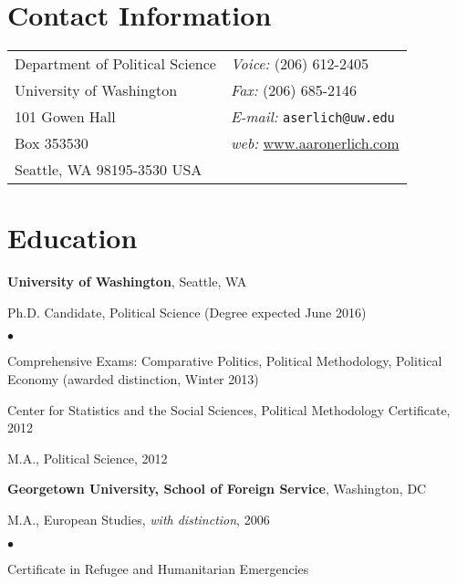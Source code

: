 \documentclass[margin,line]{res}
\newenvironment{list1}{
  \begin{list}{\ding{113}}{%
      \setlength{\itemsep}{0in}
      \setlength{\parsep}{0in} \setlength{\parskip}{0in}
      \setlength{\topsep}{0in} \setlength{\partopsep}{0in} 
      \setlength{\leftmargin}{0.17in}}}{\end{list}}
\newenvironment{list2}{
  \begin{list}{$\bullet$}{%
      \setlength{\itemsep}{0in}
      \setlength{\parsep}{0in} \setlength{\parskip}{0in}
      \setlength{\topsep}{0in} \setlength{\partopsep}{0in} 
      \setlength{\leftmargin}{0.2in}}}{\end{list}}
\begin{document}
{\name{\textcolor{Maroon}{\LARGE	Aaron S. Erlich} \vspace*{.1in}}

\begin{resume}
\section{\sc Contact Information}
\vspace{.05in}
\begin{tabular}{@{}p{2in}p{4in}}
Department of Political Science        &    {\it Voice:}  (206) 612-2405 \\            
University of Washington   &    {\it Fax:}    (206) 685-2146\\         
101 Gowen Hall   & {\it E-mail:} \texttt{aserlich@uw.edu}\\       
Box 353530  &    {\it web:} \url{www.aaronerlich.com} \\     
Seattle, WA 98195-3530 USA &
\end{tabular}


\section{\sc Education}
{\bf University of Washington}, Seattle, WA\\
\vspace*{-.1in}
\begin{list1}
\item[] Ph.D. Candidate, Political Science (Degree expected June 2016)
 \begin{list2}
 \item[] Comprehensive Exams: Comparative Politics, Political
   Methodology, Political Economy (awarded distinction, Winter 2013)
\item[] Center for Statistics and the Social Sciences, Political
  Methodology Certificate, 2012
\item[] M.A., Political Science, 2012
\end{list2}
\end{list1}

{\bf Georgetown University, School of Foreign Service}, Washington, DC \\
\vspace*{-.1in}
\begin{list1}
\item[] M.A., European Studies, \emph{with distinction},  2006
  \begin{list2}
\item[] Certificate in Refugee and Humanitarian Emergencies


\end{list2}
\end{list1}
\end{resume}}
\end{document}
